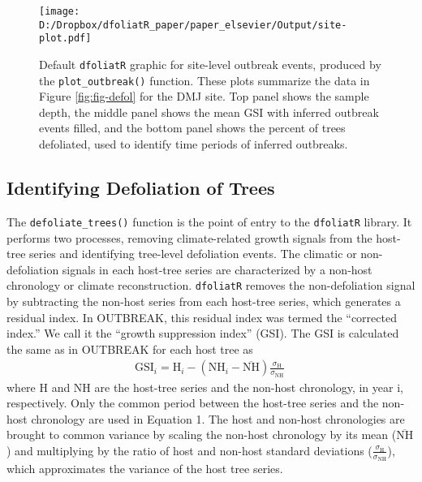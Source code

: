 \documentclass[review]{elsarticle} %
\makeatletter
\def\maxwidth{\ifdim\Gin@nat@width>\linewidth\linewidth
\else\Gin@nat@width\fi}
\let\Oldincludegraphics\includegraphics
\renewcommand{\includegraphics}[1]{\Oldincludegraphics[width=\maxwidth]{#1}}
\makeatother
\begin{document}
\begin{figure}
\centering
\texttt{[image: D:/Dropbox/dfoliatR\_paper/paper\_elsevier/Output/site-plot.pdf]}
\caption{\label{fig:fig-obr}Default \texttt{dfoliatR} graphic for site-level outbreak events, produced by the \texttt{plot\_outbreak()} function. These plots summarize the data in Figure \ref{fig:fig-defol} for the DMJ site. Top panel shows the sample depth, the middle panel shows the mean GSI with inferred outbreak events filled, and the bottom panel shows the percent of trees defoliated, used to identify time periods of inferred outbreaks.}
\end{figure}

\hypertarget{identifying-defoliation-of-trees}{%
\subsection{Identifying Defoliation of Trees}\label{identifying-defoliation-of-trees}}

The \texttt{defoliate\_trees()} function is the point of entry to the \texttt{dfoliatR} library. It performs two processes, removing climate-related growth signals from the host-tree series and identifying tree-level defoliation events. The climatic or non-defoliation signals in each host-tree series are characterized by a non-host chronology or climate reconstruction. \texttt{dfoliatR} removes the non-defoliation signal by subtracting the non-host series from each host-tree series, which generates a residual index. In OUTBREAK, this residual index was termed the ``corrected index.'' We call it the ``growth suppression index'' (GSI). The GSI is calculated the same as in OUTBREAK for each host tree as
\begin{align}
\textrm{GSI}_{i} = \textrm{H}_{i} - \left( \textrm{NH}_{i} - \overline{\textrm{NH}} \right) \frac{\sigma_{\textrm{H}}}{\sigma_{\textrm{NH}}} \
\end{align}
where H and NH are the host-tree series and the non-host chronology, in year i, respectively. Only the common period between the host-tree series and the non-host chronology are used in Equation 1. The host and non-host chronologies are brought to common variance by scaling the non-host chronology by its mean (\(\overline{\textrm{NH}}\)) and multiplying by the ratio of host and non-host standard deviations (\(\frac{\sigma_{\textrm{H}}}{\sigma_{\textrm{NH}}}\)), which approximates the variance of the host tree series.
\end{document}
